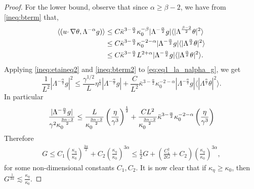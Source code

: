\documentclass[10pt,a4paper]{amsart}
\newcommand{\ga}{\gamma}
\newcommand{\kap}{\kappa}
\newcommand{\ka}{\kappa}
\newcommand{\la}{\Lambda}
\newcommand{\te}{\theta}
\begin{document}
\begin{proof}
{For the lower bound, observe that since $\alpha \ge \beta-2$, we} have from \eqref{ineq:bterm} {that}, 
    \begin{align} \label{ineq:bterm2}
    \langle (u \cdotp\nabla \te, \la^{-\alpha}g) \rangle  & \le C \bar{\ka}^{3-\frac{\alpha}{2}}\ka_0^{-\beta} |\la^{-\frac{\alpha}{2}}g| \langle |\la^{\frac{\beta-2}{2}}\te|^2 \rangle \notag
    \\
    & \le C \bar{\ka}^{3-\frac{\alpha}{2}} \ka_0^{-2-\alpha} |\la^{-\frac{\alpha}{2}}g| \langle |\la^{\frac{\alpha}{2}}\te|^2 \rangle \notag
    \\
    &\leq C \bar{\ka}^{3-\frac{\alpha}{2}} L^{2+\alpha} |\la^{-\frac{\alpha}{2}}g| \langle |\la^{\frac{\alpha}{2}}\te|^2 \rangle.   
    \end{align}   
Applying \eqref{ineq:etaineq2} and \eqref{ineq:bterm2} to \eqref{eq:eq1_la_nalpha_g}, we get
    \begin{equation*} 
         \frac{1}{L^2} |\la^{-\frac{\alpha}{2}} g|^2 \le \frac{\ga^{1/2}}{L} \eta^{\frac{1}{2}} |\la^{-\frac{\alpha}{2}}g| + \frac{C}{L^2} \bar{\ka}^{3-\frac{\alpha}{2}} \ka_0^{-2-\alpha} |\la^{-\frac{\alpha}{2}}g| \langle |\la^{\frac{\alpha}{2}}\te|^2 \rangle.
    \end{equation*}
In particular
    \begin{align}\notag
        \frac{|\la^{-\frac{\alpha}{2}}g|}{\ga^2 \kappa_0^{\frac{3\alpha-2}{2}}} \le \frac{L}{\kappa_0^{\frac{3\alpha-2}{2}}} \left(\frac{\eta}{\ga^3}\right)^{\frac{1}{2}} + \frac{CL^2}{\kappa_0^{\frac{3\alpha-2}{2}}}\bar{\ka}^{3-\frac{\alpha}{2}} \ka_0^{-2-\alpha}\left(\frac{\eta}{\ga^3}\right)
    \end{align}
Therefore
    \begin{align}\label{ineq:g3}
        G \le C_1 \left(\frac{\ka_\eta}{\ka_0}\right)^{\frac{3\alpha}{2}} + C_2 \left(\frac{\ka_\eta}{\ka_0}\right)^{3\alpha}\leq \frac{1}2G+\left(\frac{C_1^2}{2G}+C_2\right)\left(\frac{\ka_\eta}{\ka_0}\right)^{3\alpha},
    \end{align}
{for some non-dimensional constants $C_1, C_2$. It is now clear that if $\kap_\eta\geq\kap_0$, then $G^{\frac{1}{3\alpha}} \lesssim \frac{\ka_\eta}{\ka_0}$.}  
\end{proof}
\end{document}
